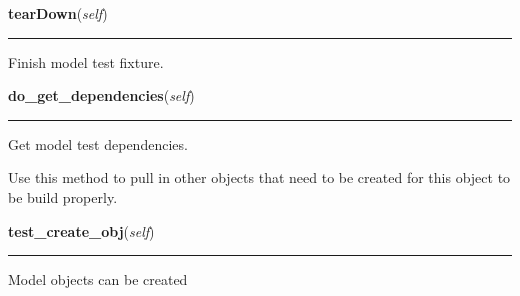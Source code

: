     \vspace{0.5ex}

\hspace{.8\funcindent}\begin{boxedminipage}{\funcwidth}

    \raggedright \textbf{tearDown}(\textit{self})

    \vspace{-1.5ex}

    \rule{\textwidth}{0.5\fboxrule}
\setlength{\parskip}{2ex}
    Finish model test fixture.

\setlength{\parskip}{1ex}
    \end{boxedminipage}

    \label{saip:tests:models:ModelTest:do_get_dependencies}

    \vspace{0.5ex}

\hspace{.8\funcindent}\begin{boxedminipage}{\funcwidth}

    \raggedright \textbf{do\_get\_dependencies}(\textit{self})

    \vspace{-1.5ex}

    \rule{\textwidth}{0.5\fboxrule}
\setlength{\parskip}{2ex}
    Get model test dependencies.

    Use this method to pull in other objects that need to be created for 
    this object to be build properly.

\setlength{\parskip}{1ex}
    \end{boxedminipage}

    \label{saip:tests:models:ModelTest:test_create_obj}

    \vspace{0.5ex}

\hspace{.8\funcindent}\begin{boxedminipage}{\funcwidth}

    \raggedright \textbf{test\_create\_obj}(\textit{self})

    \vspace{-1.5ex}

    \rule{\textwidth}{0.5\fboxrule}
\setlength{\parskip}{2ex}
    Model objects can be created

\setlength{\parskip}{1ex}
    \end{boxedminipage}

